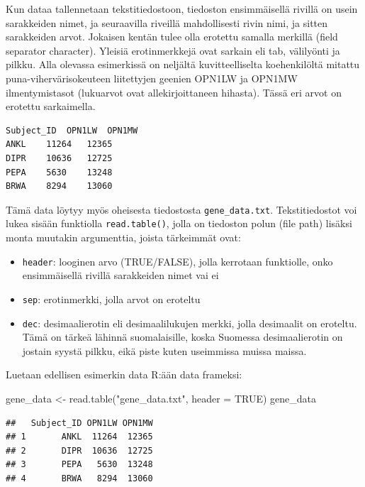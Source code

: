 \documentclass[
]{book}
\newenvironment{Shaded}{\begin{snugshade}}{\end{snugshade}}
\newcommand{\AttributeTok}[1]{\textcolor[rgb]{0.77,0.63,0.00}{#1}}
\newcommand{\ConstantTok}[1]{\textcolor[rgb]{0.00,0.00,0.00}{#1}}
\newcommand{\FunctionTok}[1]{\textcolor[rgb]{0.00,0.00,0.00}{#1}}
\newcommand{\NormalTok}[1]{#1}
\newcommand{\OtherTok}[1]{\textcolor[rgb]{0.56,0.35,0.01}{#1}}
\newcommand{\StringTok}[1]{\textcolor[rgb]{0.31,0.60,0.02}{#1}}
\providecommand{\tightlist}{%
  \setlength{\itemsep}{0pt}\setlength{\parskip}{0pt}}
\begin{document}
Kun dataa tallennetaan tekstitiedostoon, tiedoston ensimmäisellä rivillä on usein sarakkeiden nimet, ja seuraavilla riveillä mahdollisesti rivin nimi, ja sitten sarakkeiden arvot. Jokaisen kentän tulee olla erotettu samalla merkillä (field separator character). Yleisiä erotinmerkkejä ovat sarkain eli tab, välilyönti ja pilkku. Alla olevassa esimerkissä on neljältä kuvitteelliselta koehenkilöltä mitattu puna-vihervärisokeuteen liitettyjen geenien OPN1LW ja OPN1MW ilmentymistasot (lukuarvot ovat allekirjoittaneen hihasta). Tässä eri arvot on erotettu sarkaimella.

\begin{verbatim}
Subject_ID  OPN1LW  OPN1MW
ANKL    11264   12365
DIPR    10636   12725
PEPA    5630    13248
BRWA    8294    13060
\end{verbatim}

Tämä data löytyy myös oheisesta tiedostosta \texttt{gene\_data.txt}. Tekstitiedostot voi lukea sisään funktiolla \texttt{read.table()}, jolla on tiedoston polun (file path) lisäksi monta muutakin argumenttia, joista tärkeimmät ovat:

\begin{itemize}
\tightlist
\item
  \texttt{header}: looginen arvo (TRUE/FALSE), jolla kerrotaan funktiolle, onko ensimmäisellä rivillä sarakkeiden nimet vai ei
\item
  \texttt{sep}: erotinmerkki, jolla arvot on eroteltu
\item
  \texttt{dec}: desimaalierotin eli desimaalilukujen merkki, jolla desimaalit on eroteltu. Tämä on tärkeä lähinnä suomalaisille, koska Suomessa desimaalierotin on jostain syystä pilkku, eikä piste kuten useimmissa muissa maissa.
\end{itemize}

Luetaan edellisen esimerkin data R:ään data frameksi:

\begin{Shaded}
\begin{Highlighting}[]
\NormalTok{gene\_data }\OtherTok{\textless{}{-}} \FunctionTok{read.table}\NormalTok{(}\StringTok{"gene\_data.txt"}\NormalTok{, }\AttributeTok{header =} \ConstantTok{TRUE}\NormalTok{)}
\NormalTok{gene\_data}
\end{Highlighting}
\end{Shaded}

\begin{verbatim}
##   Subject_ID OPN1LW OPN1MW
## 1       ANKL  11264  12365
## 2       DIPR  10636  12725
## 3       PEPA   5630  13248
## 4       BRWA   8294  13060
\end{verbatim}
\end{document}
